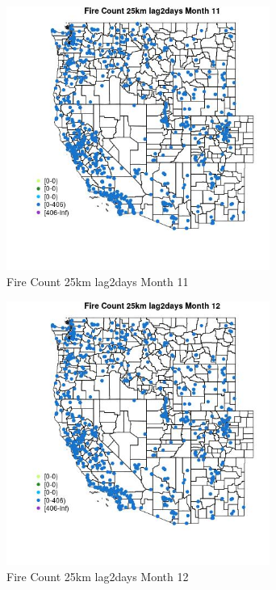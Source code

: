 \begin{figure} 
\centering  
\includegraphics[width=0.77\textwidth]{Code_Outputs/Report_ML_input_PM25_Step4_part_f_de_duplicated_aveswNAs_MapObsMo11Fire_Count_25km_lag2days.jpg} 
\caption{\label{fig:Report_ML_input_PM25_Step4_part_f_de_duplicated_aveswNAsMapObsMo11Fire_Count_25km_lag2days}Fire Count 25km lag2days Month 11} 
\end{figure} 
 

\clearpage 

\begin{figure} 
\centering  
\includegraphics[width=0.77\textwidth]{Code_Outputs/Report_ML_input_PM25_Step4_part_f_de_duplicated_aveswNAs_MapObsMo12Fire_Count_25km_lag2days.jpg} 
\caption{\label{fig:Report_ML_input_PM25_Step4_part_f_de_duplicated_aveswNAsMapObsMo12Fire_Count_25km_lag2days}Fire Count 25km lag2days Month 12} 
\end{figure} 
 

